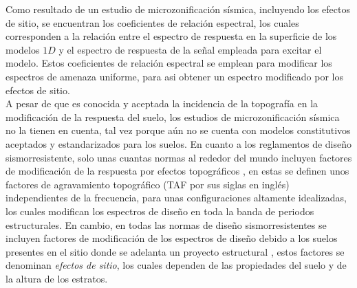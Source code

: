 \documentclass[spanish,letterpaper,12pt,twoside,openany]{article}
\begin{document}
%
Como resultado de un estudio de microzonificación sísmica, incluyendo los efectos de sitio, se encuentran los coeficientes de relación espectral, los cuales corresponden a la relación entre el espectro de respuesta en la superficie de los modelos $1D$ y el espectro de respuesta de la señal empleada para excitar el modelo. Estos coeficientes de relación espectral se emplean para modificar los espectros de amenaza uniforme, para asi obtener un espectro modificado por los efectos de sitio.\\
%
A pesar de que es conocida y aceptada la incidencia de la topografía en la modificación de la respuesta del suelo, los estudios de microzonificación sísmica no la tienen en cuenta, tal vez porque aún no se cuenta con modelos constitutivos aceptados y estandarizados para los suelos. En cuanto a los reglamentos de diseño sismorresistente, solo unas cuantas normas al rededor del mundo incluyen factores de modificación de la respuesta por efectos topográficos \citep{EC8, AFPS1995}, en estas se definen unos factores de agravamiento topográfico (TAF por sus siglas en inglés) independientes de la frecuencia, para unas configuraciones altamente idealizadas, los cuales modifican los espectros de diseño en toda la banda de periodos estructurales. En cambio, en todas las normas de diseño sismorresistentes se incluyen factores de modificación de los espectros de diseño debido a los suelos presentes en el sitio donde se adelanta un proyecto estructural \citep[por ejemplo][entre muchas otras]{NSR-10}, estos factores se denominan \textit{efectos de sitio}, los cuales dependen de las propiedades del suelo y de la altura de los estratos.
\end{document}
